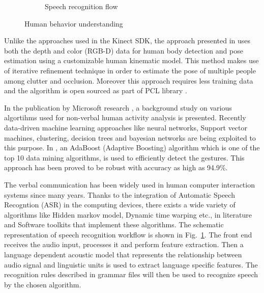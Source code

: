 \begin{figure}
\begin{subfigure}[t]{0.48\textwidth}
\caption[Speech recognition flow]{Speech recognition flow}
\label{fig:speech_recog}
\end{subfigure}
\caption[Human behavior understanding]{Human behavior understanding}
\label{fig:behavior_understand}
\end{figure} 
Unlike the approaches used in the Kinect SDK, the approach presented in \cite{buys2014adaptable} uses both the depth and color (RGB-D) data for human body detection and pose estimation using a customizable human kinematic model. This method makes use of iterative refinement technique in order to estimate the pose of multiple people among clutter and occlusion. Moreover this approach requires less training data and the algorithm is open sourced as part of PCL library \cite{rusu20113d}.  

In the publication by Microsoft research \cite{han2013enhanced}, a background study on various algortihms used for non-verbal human activity analysis is presented. Recently \cite{KinectSDK2014} data-driven machine learning approaches like neural networks, Support vector machines, clustering, decision trees and bayesian networks are being exploited to this purpose. In \cite{KinectSDK2014}, an AdaBoost (Adaptive Boosting) algorithm \cite{freund1997decision} which is one of the top 10 data mining algorithms, is used to efficiently detect the gestures. This approach has been proved to be robust with accuracy as high as 94.9\%. 

The verbal communication has been widely used in human computer interaction systems since many years. Thanks to the integration of Automatic Speech Recogntion (ASR) in the computing devices, there exists a wide variety of algorithms like Hidden markov model, Dynamic time warping etc., in literature \cite{reddy1976speech} \cite{lippmann1997speech} and Software toolkits \cite{SpeechSdk} that implement these algorithms. The schematic representation of speech recognition workflow is shown in Fig.~\ref{fig:speech_recog}. The front end receives the audio input, processes it and perform feature extraction. Then a language dependent acoustic model that represents the relationship between audio signal and linguistic units is used to extract language specific features. The recognition rules described in grammar files \cite{Hunt:04:SRG} will then be used to recognize speech by the chosen algorithm.

